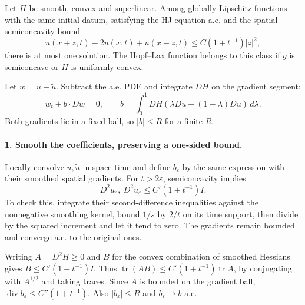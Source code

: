 \begin{theorem}
Let $H$ be smooth, convex and superlinear. Among globally Lipschitz
functions with the same initial datum, satisfying the HJ equation a.e.
and the spatial semiconcavity bound
\[
 u(x+z,t)-2u(x,t)+u(x-z,t)
 \leq C(1+t^{-1})|z|^2,
\]
there is at most one solution.
The Hopf--Lax function belongs to this class if $g$ is semiconcave
or $H$ is uniformly convex.
\end{theorem}
\begin{expandedproof}
Let $w=u-\widetilde u$. Subtract the a.e. PDE and integrate $DH$
on the gradient segment:
\[
 w_t+b\cdot Dw=0,\qquad
 b=\int_0^1 DH(\lambda Du+(1-\lambda)D\widetilde u)\,d\lambda .
\]
Both gradients lie in a fixed ball, so $|b|\leq R$ for a finite $R$.

\paragraph{1. Smooth the coefficients, preserving a one-sided bound.}
Locally convolve $u,\widetilde u$ in space-time and define $b_\varepsilon$
by the same expression with their smoothed spatial gradients.
For $t>2\varepsilon$, semiconcavity implies
\[
 D^2u_\varepsilon,\ D^2\widetilde u_\varepsilon
      \leq C'(1+t^{-1})I .
\]
To check this, integrate their second-difference inequalities against
the nonnegative smoothing kernel, bound $1/s$ by $2/t$ on its time
support, then divide by the squared increment and let it tend to zero.
The gradients remain bounded and converge a.e. to the original ones.

Writing $A=D^2H\geq0$ and $B$ for the convex combination of smoothed
Hessians gives $B\leq C'(1+t^{-1})I$.
Thus $\operatorname{tr}(AB)\leq C'(1+t^{-1})\operatorname{tr}A$,
by conjugating with $A^{1/2}$ and taking traces.
Since $A$ is bounded on the gradient ball,
$\operatorname{div}b_\varepsilon\leq C''(1+t^{-1})$.
Also $|b_\varepsilon|\leq R$ and $b_\varepsilon\to b$ a.e.

\Needspace{45mm}

\end{expandedproof}
